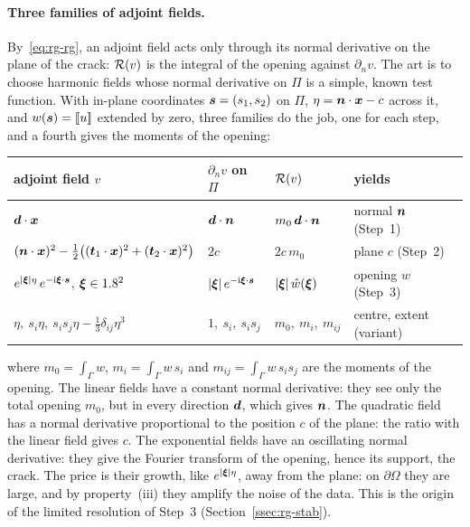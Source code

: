 \paragraph{Three families of adjoint fields.}
%
By~\eqref{eq:rg-rg}, an adjoint field acts only through its normal derivative
on the plane of the crack: $\mathcal{R}(v)$ is the integral of the opening against
$\partial_nv$. The art is to choose harmonic fields whose normal derivative on
$\Pi$ is a simple, known test function. With in-plane coordinates
$\bm{s}=(s_1,s_2)$ on $\Pi$, $\eta=\bm{n}\cdot\bm{x}-c$ across it, and $w(\bm{s})=[\![u]\!]$
extended by zero, three families do the job, one for each step, and a fourth
gives the moments of the opening:
\begin{center}\small
\renewcommand{\arraystretch}{1.2}
\begin{tabular}{llll}
\toprule
\sffamily adjoint field $v$ & \sffamily $\partial_n v$ on $\Pi$ & \sffamily $\mathcal{R}(v)$ & \sffamily yields\\
\midrule
$\bm{d}\cdot\bm{x}$ & $\bm{d}\cdot\bm{n}$ & $m_0\,\bm{d}\cdot\bm{n}$ & normal $\bm{n}$ (Step~1)\\
$(\bm{n}\cdot\bm{x})^2-\tfrac12\bigl((\bm{t}_1\cdot\bm{x})^2+(\bm{t}_2\cdot\bm{x})^2\bigr)$ & $2c$ & $2c\,m_0$ & plane $c$ (Step~2)\\
$e^{|\bm{\xi}|\eta}\,e^{-\mathrm i\bm{\xi}\cdot\bm{s}}$, $\bm{\xi}\in1.8^2$ & $|\bm{\xi}|\,e^{-\mathrm i\bm{\xi}\cdot\bm{s}}$ & $|\bm{\xi}|\,\hat w(\bm{\xi})$ & opening $w$ (Step~3)\\
$\eta,\ s_i\eta,\ s_is_j\eta-\tfrac13\delta_{ij}\eta^3$ & $1,\ s_i,\ s_is_j$ & $m_0,\ m_i,\ m_{ij}$ & centre, extent (variant)\\
\bottomrule
\end{tabular}
\end{center}
where $\displaystyle m_0=\int_\Gamma w$, $\displaystyle m_i=\int_\Gamma w\,s_i$ and $\displaystyle m_{ij}=\int_\Gamma w\,s_is_j$ are the moments of the opening. The linear fields have a constant normal derivative: they see only the total opening $m_0$, but in every direction $\bm{d}$, which gives $\bm{n}$. The quadratic field has a normal derivative proportional to the position $c$ of the plane: the ratio with the linear field gives $c$. The exponential fields have an oscillating normal derivative: they give the Fourier transform of the opening, hence its support, the crack. The price is their growth, like $e^{|\bm{\xi}|\eta}$, away from the plane: on $\partial\Omega$ they are large, and by property~(iii) they amplify the noise of the data. This is the origin of the limited resolution of Step~3 (Section~\ref{ssec:rg-stab}).


